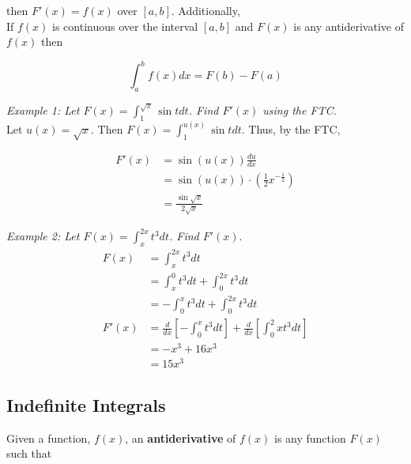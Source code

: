 \documentclass{article}
\begin{document}
            \noindent then $F'(x)=f(x)$ over $[a,b]$. Additionally, \\

            \noindent If $f(x)$ is continuous over the interval $[a,b]$ and $F(x)$ is any
            antiderivative of $f(x)$ then

            \begin{equation*}
                \int^b_a f(x)dx = F(b) - F(a)
            \end{equation*}

            \pagebreak
            \noindent \color{blue} \textit{Example 1: Let $F(x)=\int_1^{\sqrt{x}}\sin{t} dt$.
            Find $F'(x)$ using the FTC.} \color{black} \\

            \noindent Let $u(x)=\sqrt{x}$. Then $F(x)=\int_1^{u(x)}\sin{t}dt$. Thus, by the FTC,

            \begin{align*}
                F'(x) &= \sin{(u(x))}\frac{du}{dx} \\
                      &= \sin{(u(x))}\cdot\left(\frac{1}{2}x^{-\frac{1}{2}}\right) \\
                      &= \frac{\sin{\sqrt{x}}}{2\sqrt{x}}
            \end{align*}

            \noindent \color{blue} \textit{Example 2: Let $F(x)=\int^{2x}_x t^3 dt$. Find $F'(x).$}
            \color{black} \\

            \begin{align*}
                F(x)    &= \int_x^{2x} t^3 dt \\
                        &= \int_x^0 t^3 dt + \int_0^{2x} t^3 dt \\
                        &= -\int_0^x t^3 dt + \int_0^{2x} t^3 dt \\
                F'(x)   &= \frac{d}{dx}\left[-\int_0^x t^3 dt\right] +
                        \frac{d}{dx}\left[\int_0^2x t^3 dt\right] \\
                        &= -x^3 + 16x^3 \\
                        &= 15x^3
            \end{align*}


        \subsection{Indefinite Integrals}
            Given a function, $f(x)$, an \textbf{antiderivative} of $f(x)$ is any function $F(x)$ such that
\end{document}
